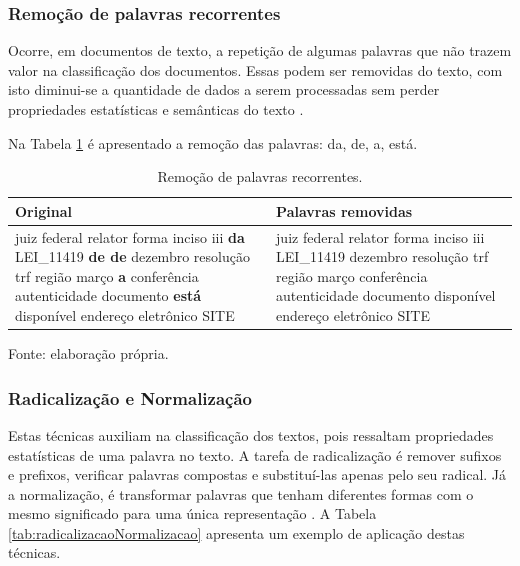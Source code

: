 \subsubsection{Remoção de palavras recorrentes}

Ocorre, em documentos de texto, a repetição de algumas palavras que não trazem valor na classificação dos documentos. Essas podem ser removidas do texto, com isto diminui-se a quantidade de dados a serem processadas sem perder propriedades estatísticas e semânticas do texto \cite{manning_introduction_2008}. 

Na Tabela \ref{tab:palavrasRecorrentes} é apresentado a remoção das palavras: da, de, a, está.

\begin{table}[ht]
	\centering    
	\caption[Remoção de palavras recorrentes]{Remoção de palavras recorrentes.}
    \label{tab:palavrasRecorrentes}
	\begin{tabular}{|p{7cm}|p{7cm}|}
    \hline
    \textbf{Original} & \textbf{Palavras removidas}\\ \hline
	juiz federal relator forma inciso iii \textbf{da} LEI\_11419 \textbf{de de} dezembro resolução trf região março \textbf{a} conferência autenticidade documento \textbf{está} disponível endereço eletrônico SITE & juiz federal relator forma inciso iii LEI\_11419 dezembro resolução trf região março conferência autenticidade documento disponível endereço eletrônico SITE
    \\ \hline
    \end{tabular}\par Fonte: elaboração própria.
\end{table}

\subsubsection{Radicalização e Normalização}

Estas técnicas auxiliam na classificação dos textos, pois ressaltam propriedades estatísticas de uma palavra no texto. A tarefa de radicalização é remover sufixos e prefixos, verificar palavras compostas e substituí-las apenas pelo seu radical. Já a normalização, é transformar palavras que tenham diferentes formas com o mesmo significado para uma única representação \cite{singh_text_2016}. A Tabela \ref{tab:radicalizacaoNormalizacao} apresenta um exemplo de aplicação destas técnicas.

